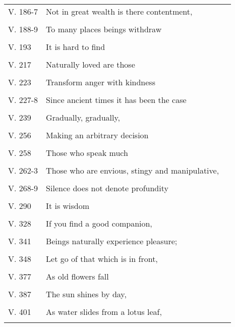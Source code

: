 {\begin{longtable}[c]{llr}
V. 186-7 & Not in great wealth is there contentment,\\ & \pageref{dhp-186}\\
V. 188-9 & To many places beings withdraw\\ & \pageref{dhp-188}\\
V. 193 & It is hard to find\\ & \pageref{dhp-193}\\
V. 217 & Naturally loved are those\\ & \pageref{dhp-217}\\
V. 223 & Transform anger with kindness\\ & \pageref{dhp-223}\\
V. 227-8 & Since ancient times it has been the case\\ & \pageref{dhp-227}\\
V. 239 & Gradually, gradually,\\ & \pageref{dhp-239}\\
V. 256 & Making an arbitrary decision\\ & \pageref{dhp-256}\\
V. 258 & Those who speak much\\ & \pageref{dhp-258}\\
V. 262-3 & Those who are envious, stingy and manipulative,\\ & \pageref{dhp-262}\\
V. 268-9 & Silence does not denote profundity\\ & \pageref{dhp-268}\\
V. 290 & It is wisdom\\ & \pageref{dhp-290}\\
V. 328 & If you find a good companion,\\ & \pageref{dhp-328}\\
V. 341 & Beings naturally experience pleasure;\\ & \pageref{dhp-341}\\
V. 348 & Let go of that which is in front,\\ & \pageref{dhp-348}\\
V. 377 & As old flowers fall\\ & \pageref{dhp-377}\\
V. 387 & The sun shines by day,\\ & \pageref{dhp-387}\\
V. 401 & As water slides from a lotus leaf,\\ & \pageref{dhp-401}\\
\end{longtable}

}

